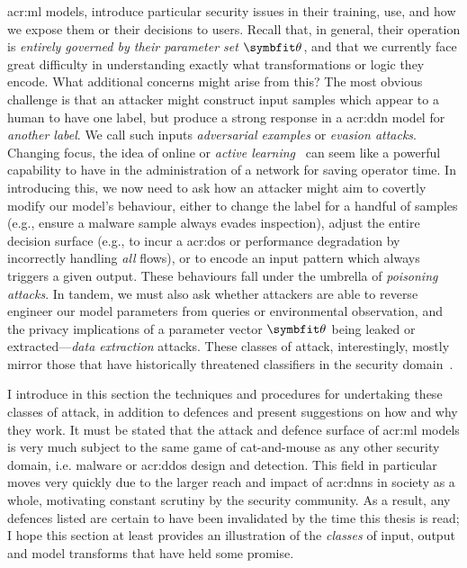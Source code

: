 \gls{acr:ml} models, introduce particular security issues in their training, use, and how we expose them or their decisions to users.
Recall that, in general, their operation is \emph{entirely governed by their parameter set $\wvec{}$}, and that we currently face great difficulty in understanding exactly what transformations or logic they encode.
What additional concerns might arise from this?
The most obvious challenge is that an attacker might construct input samples which appear to a human to have one label, but produce a strong response in a \gls{acr:ddn} model for \emph{another label}.
We call such inputs \emph{adversarial examples} or \emph{evasion attacks}.
Changing focus, the idea of online or \emph{active learning}~\parencite{active-learning-report} can seem like a powerful capability to have in the administration of a network for saving operator time.
In introducing this, we now need to ask how an attacker might aim to covertly modify our model's behaviour, either to change the label for a handful of samples (e.g., ensure a malware sample always evades inspection), adjust the entire decision surface (e.g., to incur a \gls{acr:dos} or performance degradation by incorrectly handling \emph{all} flows), or to encode an input pattern which always triggers a given output.
These behaviours fall under the umbrella of \emph{poisoning attacks}.
In tandem, we must also ask whether attackers are able to reverse engineer our model parameters from queries or environmental observation, and the privacy implications of a parameter vector $\wvec{}$ being leaked or extracted---\emph{data extraction} attacks.
These classes of attack, interestingly, mostly mirror those that have historically threatened classifiers in the security domain~\parencite{DBLP:conf/ccs/BarrenoNSJT06}.


I introduce in this section the techniques and procedures for undertaking these classes of attack, in addition to defences and present suggestions on how and why they work.
It must be stated that the attack and defence surface of \gls{acr:ml} models is very much subject to the same game of cat-and-mouse as any other security domain, i.e. malware or \gls{acr:ddos} design and detection.
This field in particular moves very quickly due to the larger reach and impact of \glspl{acr:dnn} in society as a whole, motivating constant scrutiny by the security community.
As a result, any defences listed are certain to have been invalidated by the time this thesis is read; I hope this section at least provides an illustration of the \emph{classes} of input, output and model transforms that have held some promise.

